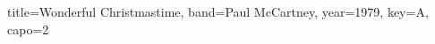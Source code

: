 \documentclass{skrul-leadsheet}
\begin{document}
\begin{song}[transpose-capo=true]{title={Wonderful Christmastime}, band={Paul McCartney}, year={1979}, key={A}, capo={2}}



\end{song}
\end{document}

